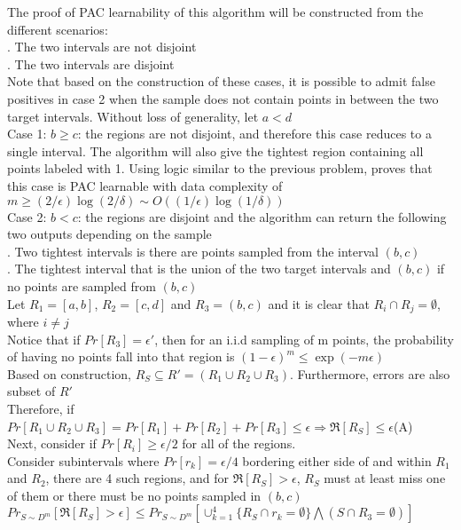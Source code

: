 \documentclass[11pt, oneside]{article}   	%
\begin{document}
The proof of PAC learnability of this algorithm will be constructed from the different scenarios:\\
. The two intervals are not disjoint\\
. The two intervals are disjoint\\
Note that based on the construction of these cases, it is possible to admit false positives in case 2 when the sample does not contain points in between the two target intervals.
Without loss of generality, let $a<d$\\
\indent Case 1: $b\geq c$: the regions are not disjoint, and therefore this case reduces to a single interval. The algorithm will also give the tightest region containing all points labeled with 1. Using logic similar to the previous problem, proves that this case is PAC learnable with data complexity of $m\geq(2/\epsilon)\log(2/\delta)\sim O((1/\epsilon) \log(1/\delta))$\\
\indent Case 2: $b<c$: the regions are disjoint and the algorithm can return the following two outputs depending on the sample\\
\indent{}. Two tightest intervals is there are points sampled from the interval $(b,c)$\\
\indent{}. The tightest interval that is the union of the two target intervals and $(b,c)$ if no points are sampled from $(b,c)$\\
Let $R_1=[a,b]$, $R_2=[c,d]$ and $R_3=(b,c)$ and it is clear that $R_i\cap R_j=\emptyset$, where $i\neq j$\\
\indent Notice that if $Pr[R_3]=\epsilon'$, then for an i.i.d sampling of m points, the probability of having no points fall into that region is $(1-\epsilon)^m\leq \exp(-m\epsilon)$\\
\indent Based on construction, $R_S\subseteq R'=(R_1\cup R_2 \cup R_3)$. Furthermore, errors are also subset of $R'$\\
\indent Therefore, if $Pr[R_1\cup R_2 \cup R_3]=Pr[R_1]+Pr[R_2]+Pr[R_3]\leq\epsilon\Rightarrow\Re[R_S]\leq\epsilon$\hfill(A)\\
\indent Next, consider if $Pr[R_i]\geq\epsilon/2$ for all of the regions.\\
\indent Consider subintervals where $Pr[r_k]=\epsilon/4$ bordering either side of and within $R_1$ and $R_2$, there are 4 such regions, and for $\Re[R_S]>\epsilon$, $R_S$ must at least miss one of them or there must be no points sampled in $(b,c)$\\
\indent $Pr_{S\sim D^m}[\Re[R_S]>\epsilon]\leq Pr_{S\sim D^m}[\cup_{k=1}^4\{R_S\cap r_k=\emptyset\}\bigwedge(S\cap R_3=\emptyset)]$\\
\end{document}
